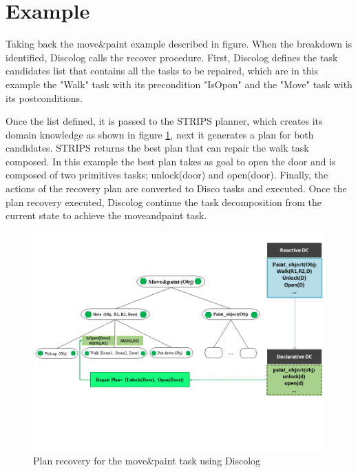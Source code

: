 \section{Example}
Taking back the move\&paint example described in figure. When the breakdown is identified, Discolog calls the recover procedure. First, Discolog  defines  the task candidates list that contains all the tasks to be repaired, which are in this example the "Walk" task with its precondition "IsOpon" and the "Move" task with its postconditions. 

Once the list defined, it is passed to the STRIPS planner, which creates its domain knowledge as shown in figure \ref{Plan recovery}, next it generates a plan for both candidates. STRIPS returns the best plan that can repair the walk task composed. In this example the best plan takes as goal to open the door and is composed of two primitives tasks; unlock(door) and open(door). 
Finally, the actions of the recovery plan are converted to Disco tasks and executed. Once the plan recovery executed, Discolog continue the task decomposition from the current state to achieve the moveandpaint task. 

\begin{figure}[h]
	\centering
	\includegraphics[width=\textwidth]{Pictures/repair.png}
	\caption{\label{Plan recovery} Plan recovery for the move\&paint task using Discolog}
\end{figure}
